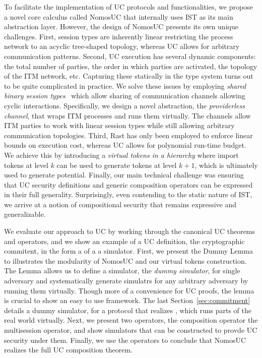 To facilitate the implementation of UC protocols and functionalities, we propose a novel core calculus called NomosUC that
internally uses IST as its main abstraction layer.
However, the design of NomosUC presents its own unique challenges.
First, session types are inherently linear restricting the process network to an acyclic tree-shaped topology,
whereas UC allows for arbitrary communication patterns.
Second, UC execution has several dynamic components: the total number of parties, the order in which parties are activated,
the topology of the ITM network, etc.
Capturing these statically in the type system turns out to be quite complicated in practice.
We solve these issues by employing \emph{shared binary session types}~\cite{balzer2017manifest} which allow sharing
of communication channels allowing cyclic interactions.
Specifically, we design a novel abstraction, the \emph{providerless channel}, that wraps ITM processes and runs them virtually.
The channels allow ITM parties to work with linear session types while still allowing arbitrary communication topologies.
Third, Rast has only been employed to enforce linear bounds on execution cost, whereas UC allows for polynomial run-time budget.
We achieve this by introducing a \emph{virtual tokens in a hierarchy} where import tokens at level $k$ can be used to generate
tokens at level $k+1$, which is ultimately used to generate potential.
Finally, our main technical challenge was ensuring that UC security definitions and generic composition operators
can be expressed in their full generality.
Surprisingly, even contending to the static nature of IST, we arrive at a notion of compositional security that remains expressive and generalizable.

We evaluate our approach to UC by working through the canonical UC theorems and operators, and we show an example of a UC definition,
the cryptographic commitent, in the form a of a a simulator. 
First, we present the Dummy Lemma to illustrates the modularity of NomosUC and our virtual tokens construction.
The Lemma allows us to define a simulator, the \emph{dummy simulator}, for single adversary and systematically generate simulatrs for any arbitrary adversary
by running them virtually. Though more of a convenience for UC proofs, the lemma is crucial to show an easy to use framework.
The last Section~\ref{sec:commitment} details a dummy simulator, for a protocol that realizes \Fcom, which runs parts of the real world virtually. 
Next, we present two operators, the composition operator the multisession operator, and show simulators that can be constructed to provde UC security under them.
Finally, we use the operators to conclude that NomosUC realizes the full UC composition theorem.


